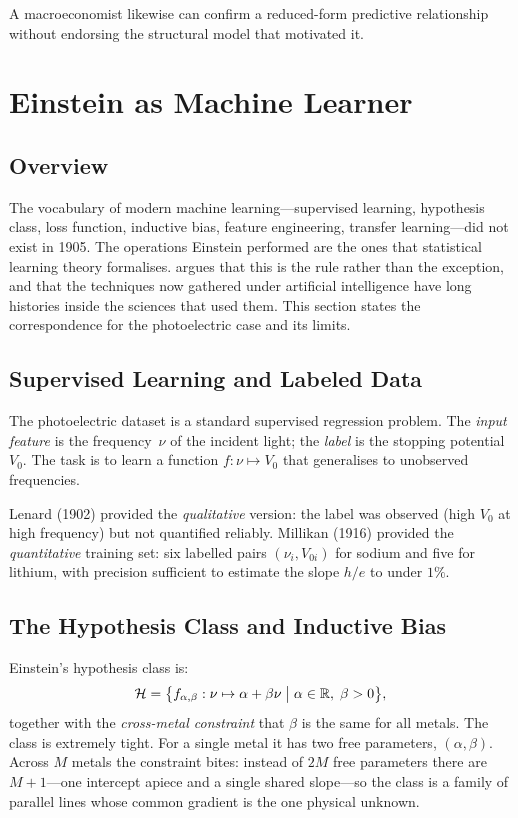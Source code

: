 \documentclass[12pt]{article}
\begin{document}
A macroeconomist likewise can confirm a reduced-form predictive relationship
without endorsing the structural model that motivated it.

\section{Einstein as Machine Learner}
\label{sec:ml}

\subsection{Overview}

The vocabulary of modern machine learning---supervised learning, hypothesis
class, loss function, inductive bias, feature engineering, transfer
learning---did not exist in 1905.  The operations Einstein performed are the
ones that statistical learning theory formalises.
\citet{sargent2025sources} argues that this is the rule rather than the
exception, and that the techniques now gathered under artificial intelligence
have long histories inside the sciences that used them.  This section states
the correspondence for the photoelectric case and its limits.

\subsection{Supervised Learning and Labeled Data}

The photoelectric dataset is a standard supervised regression problem.
The \emph{input feature} is the frequency~$\nu$ of the incident light;
the \emph{label} is the stopping potential~$V_0$.  The task is to learn
a function $f:\nu\mapsto V_0$ that generalises to unobserved frequencies.

Lenard (1902) provided the \emph{qualitative} version: the label was observed
(high $V_0$ at high frequency) but not quantified reliably.  Millikan (1916)
provided the \emph{quantitative} training set: six labelled pairs
$(\nu_i, V_{0i})$ for sodium and five for lithium, with precision sufficient
to estimate the slope $h/e$ to under $1\%$.

\subsection{The Hypothesis Class and Inductive Bias}
\label{sec:hyp_class}

Einstein's hypothesis class is:
\begin{equation}\label{eq:hyp_class}
  \mathcal{H} = \bigl\{f_{\alpha,\beta}:\nu\mapsto\alpha+\beta\nu
  \bigm|\alpha\in\mathbb{R},\;\beta>0\bigr\},
\end{equation}
together with the \emph{cross-metal constraint} that $\beta$ is the same
for all metals.  The class is extremely tight.  For a single metal it has
two free parameters, $(\alpha,\beta)$.  Across $M$ metals the constraint bites:
instead of $2M$ free parameters there are $M+1$---one intercept apiece and a
single shared slope---so the class is a family of parallel lines whose common
gradient is the one physical unknown.
\end{document}
